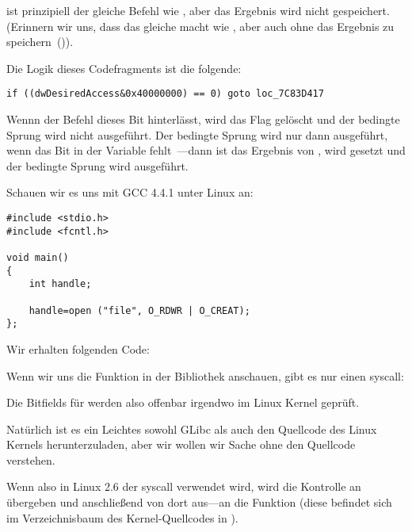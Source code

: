 \TEST ist prinzipiell der gleiche Befehl wie \AND, aber das Ergebnis wird nicht
gespeichert. (Erinnern wir uns, dass \CMP das gleiche macht wie \SUB, aber auch
ohne das Ergebnis zu speichern~()).

Die Logik dieses Codefragments ist die folgende:

\begin{lstlisting}[style=customc]
if ((dwDesiredAccess&0x40000000) == 0) goto loc_7C83D417
\end{lstlisting}

Wennn der \AND Befehl dieses Bit hinterlässt, wird das \ZF Flag gelöscht und der
bedingte Sprung \JZ wird nicht ausgeführt.
Der bedingte Sprung wird nur dann ausgeführt, wenn das Bit  in
der Variable  fehlt~---dann ist das Ergebnis von , \ZF
wird gesetzt und der bedingte Sprung wird ausgeführt.

Schauen wir es uns mit GCC 4.4.1 unter Linux an:

\begin{lstlisting}[style=customc]
#include <stdio.h>
#include <fcntl.h>

void main()
{
	int handle;

	handle=open ("file", O_RDWR | O_CREAT);
};
\end{lstlisting}

Wir erhalten folgenden Code:



Wenn wir uns die Funktion  in der Bibliothek 
anschauen, gibt es nur einen syscall:



Die Bitfields für  werden also offenbar irgendwo im Linux Kernel
geprüft.

Natürlich ist es ein Leichtes sowohl GLibc als auch den Quellcode des Linux
Kernels herunterzuladen, aber wir wollen wir Sache ohne den Quellcode verstehen.

Wenn also in Linux 2.6 der syscall  verwendet wird, wird die
Kontrolle an  übergeben und anschließend von dort aus---an die
Funktion  (diese befindet sich im Verzeichnisbaum des
Kernel-Quellcodes in ).

